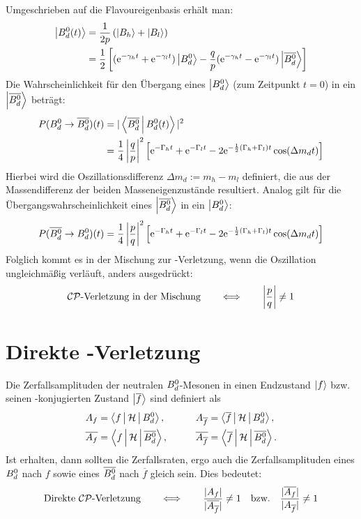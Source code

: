 Umgeschrieben auf die Flavoureigenbasis erhält man:
\begin{align}
\nonumber \Ket{\text{$B_d^0$}(t)} &= \frac{1}{2p}\left(\Ket{B_h} + \Ket{B_l}\right) \\
                       &= \frac{1}{2}\left[ (\mathrm{e}^{-\gamma_h t}+\mathrm{e}^{-\gamma_l t})\Ket{\text{$B_d^0$}} - \frac{q}{p}(\mathrm{e}^{-\gamma_h t}-\mathrm{e}^{-\gamma_l t})\Ket{\text{$\overline{B_d^0}$}}\right] \label{eg:b(t)}
\end{align}
Die Wahrscheinlichkeit für den Übergang eines $\Ket{\text{$B_d^0$}}$ (zum Zeitpunkt $t=0$) in ein $\Ket{\text{$\overline{B_d^0}$}}$ beträgt:
\begin{align}
\nonumber P(\text{$B_d^0$}\rightarrow\text{$\overline{B_d^0}$})(t) &= |\Braket{\text{$\overline{B_d^0}$}|\text{$B_d^0$}(t)}|^2 \\
                                        &= \frac{1}{4} \left|\frac{q}{p}\right|^2 \left[\mathrm{e}^{-\Gamma_h t} + \mathrm{e}^{-\Gamma_l t} - 2\mathrm{e}^{-\frac{1}{2}(\Gamma_h + \Gamma_l) t}\cos(\Delta m_d t)\right]
\end{align}
Hierbei wird die Oszillationsdifferenz $\Delta m_d := m_h - m_l$ definiert, die aus der Massendifferenz der beiden Masseneigenzustände resultiert. Analog gilt für die Übergangswahrscheinlichkeit eines $\Ket{\text{$\overline{B_d^0}$}}$ in ein $\Ket{\text{$B_d^0$}}$:
\begin{align}
P(\text{$\overline{B_d^0}$}\rightarrow \text{$B_d^0$})(t) = \frac{1}{4} \left|\frac{p}{q}\right|^2 \left[\mathrm{e}^{-\Gamma_h t} + \mathrm{e}^{-\Gamma_l t} - 2\mathrm{e}^{-\frac{1}{2}(\Gamma_h + \Gamma_l) t}\cos(\Delta m_d t)\right] 
\end{align}
Folglich kommt es in der Mischung zur \CP-Verletzung, wenn die Oszillation ungleichmäßig verläuft, anders ausgedrückt:
\begin{align}
\text{$\mathcal{CP}$-Verletzung in der Mischung} \qquad \Longleftrightarrow \qquad \left|\frac{p}{q}\right| \neq 1 
\end{align}

\section{Direkte \CP-Verletzung}
Die Zerfallsamplituden der neutralen $\text{$B_d^0$}$-Mesonen in einen Endzustand $\Ket{f}$ bzw. seinen \CP-konjugierten Zustand $\Ket{\overline{f}}$ sind definiert als
\begin{alignat}{2}
\nonumber A_f &= \Braket{f|\mathcal{H}|\text{$B_d^0$}}, && \qquad A_{\overline{f}} = \Braket{\overline{f}|\mathcal{H}|\text{$B_d^0$}}, \\
          \overline{A_f} &= \Braket{f|\mathcal{H}|\text{$\overline{B_d^0}$}}, && \qquad  \overline{A_{\overline{f}}} = \Braket{\overline{f}|\mathcal{H}|\text{$\overline{B_d^0}$}}. \label{eq:decay_amplitudes}
\end{alignat}
Ist \CP erhalten, dann sollten die Zerfallsraten, ergo auch die Zerfallsamplituden eines $\text{$B_d^0$}$ nach $f$ sowie eines $\text{$\overline{B_d^0}$}$ nach $\overline{f}$ gleich sein. Dies bedeutet:
\begin{align}
\text{Direkte $\mathcal{CP}$-Verletzung} \qquad \Longleftrightarrow \qquad \frac{|A_f|}{|\overline{A_{\overline{f}}}|} \neq 1 \quad \text{bzw.} \quad \frac{|\overline{A_f}|}{|A_{\overline{f}}|} \neq 1
\end{align}


